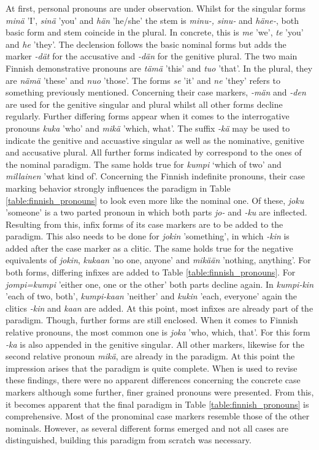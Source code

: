\documentclass[11pt,a4paper,twoside,openright]{scrbook}
\begin{document}
At first, personal pronouns are under observation. Whilst for the singular forms \textit{minä} 'I', \textit{sinä} 'you' and \textit{hän} 'he/she' the stem is \textit{minu-, sinu-} and \textit{häne-}, both basic form and stem coincide in the plural. In concrete, this is \textit{me} 'we', \textit{te} 'you' and \textit{he} 'they'. The declension follows the basic nominal forms but adds the marker \textit{-dät} for the accusative and \textit{-dän} for the genitive plural. 
The two main Finnish demonstrative pronouns are \textit{tämä} 'this' and \textit{tuo} 'that'. In the plural, they are \textit{nämä} 'these' and \textit{nuo} 'those'. The forms \textit{se} 'it' and \textit{ne} 'they' refers to something previously mentioned. Concerning their case markers, \textit{-män} and \textit{-den} are used for the genitive singular and plural whilst all other forms decline regularly.  
Further differing forms appear when it comes to the interrogative pronouns \textit{kuka} 'who' and \textit{mikä} 'which, what'. The suffix \textit{-kä} may be used to indicate the genitive and accuastive singular as well as the nominative, genitive and accusative plural. All further forms indicated by \citet{karlsson2018finn} correspond to the ones of the nominal paradigm. The same holds true for \textit{kumpi} ‘which of two’ and \textit{millainen} 'what kind of'.
Concerning the Finnish indefinite pronouns, their case marking behavior strongly influences the paradigm in Table \ref{table:finnish_pronouns} to look even more like the nominal one. Of these, \textit{joku} 'someone' is a two parted pronoun in which both parts \textit{jo-} and \textit{-ku} are inflected. Resulting from this, infix forms of its case markers are to be added to the paradigm. This also needs to be done for \textit{jokin} 'something', in which \textit{-kin} is added after the case marker as a clitic. The same holds true for the negative equivalents of \textit{jokin}, \textit{kukaan} 'no one, anyone' and \textit{mikään} 'nothing, anything'. For both forms, differing infixes are added to Table \ref{table:finnish_pronouns}. For \textit{jompi=kumpi} 'either one, one or the other' both parts decline again. In \textit{kumpi-kin} 'each of two, both', \textit{kumpi-kaan} 'neither' and \textit{kukin} 'each, everyone' again the clitics \textit{-kin} and \textit{kaan} are added. At this point, most infixes are already part of the paradigm. Though, further forms are still enclosed.
When it comes to Finnish relative pronouns, the most common one is \textit{joka} 'who, which, that'. For this form \textit{-ka} is also appended in the genitive singular. All other markers, likewise for the second relative pronoun \textit{mikä}, are already in the paradigm. At this point the impression arises that the paradigm is quite complete. When \citet{white2008finn} is used to revise these findings, there were no apparent differences concerning the concrete case markers although some further, finer grained pronouns were presented. From this, it becomes apparent that the final paradigm in Table \ref{table:finnish_pronouns} is comprehensive. Most of the pronominal case markers resemble those of the other nominals. However, as several different forms emerged and not all cases are distinguished, building this paradigm from scratch was necessary.
\end{document}
